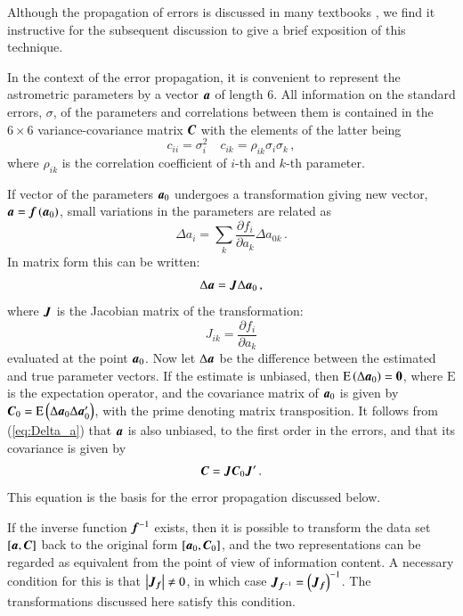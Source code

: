\documentclass{aa}
\def\vec#1{\ensuremath{\mathchoice{\mbox{\boldmath$\displaystyle#1$}}
{\mbox{\boldmath$\textstyle#1$}}
{\mbox{\boldmath$\scriptstyle#1$}}
{\mbox{\boldmath$\scriptscriptstyle#1$}}}}
\begin{document}
Although the propagation of errors is discussed in many textbooks \citep[see, for example,][]{brandt,bevington+robinson}, we find it instructive for the subsequent discussion to give a brief exposition of this technique.

In the context of the error propagation, it is convenient to represent the astrometric parameters by a vector $\vec{a}$ of length 6. All information on the standard errors, $\sigma$, of the parameters and correlations between them is contained in the $6\times 6$ variance-covariance matrix $\vec{C}$ with the elements of the latter being
\begin{equation}
    c_{ii}=\sigma_i^2\quad c_{ik}=\rho_{ik}\sigma_i\sigma_k\,,
\end{equation}
where $\rho_{ik}$ is the correlation coefficient of $i$-th and $k$-th parameter.

If vector of the parameters $\vec{a}_0$ undergoes a transformation giving new vector,  $\vec{a}=\vec{f}\left(\vec{a}_0\right)$, small variations in the parameters are related as
\begin{equation}
 \Delta a_i=\sum_k\frac{\partial f_i}{\partial a_k}\Delta a_{0k}\,.
\end{equation}
In matrix form this can be written:
\begin{equation}\label{eq:Delta_a}
 \Delta\vec{a}=\vec{J}\Delta\vec{a}_0\,,
\end{equation}
where $\vec{J}$ is the Jacobian matrix of the transformation:
\begin{equation}
 J_{ik}=\frac{\partial f_i}{\partial a_k}
\end{equation}
evaluated at the point $\vec{a}_0$. Now let $\Delta\vec{a}$ be the difference between the estimated and true parameter vectors. If the estimate is unbiased, then $\mathrm E\left(\Delta\vec{a}_0\right)=\vec{0}$, where $\mathrm E$ is the expectation operator, and the covariance matrix of $\vec{a}_0$ is given by $\vec{C}_0=\mathrm E\left(\Delta\vec{a}_0\Delta\vec{a}_0'\right)$, with the prime denoting matrix transposition. It follows from (\ref{eq:Delta_a}) that $\vec{a}$ is also unbiased, to the first order in the errors, and that its covariance is given by
\begin{equation}\label{eq:covariance_matrix}
    \vec{C}=\vec{J}\vec{C}_0\vec{J}'\,.
\end{equation}
This equation is the basis for the error propagation discussed below.

If the inverse function $\vec{f}^{-1}$ exists, then it is possible to transform the data set $\left[\vec{a}, \vec{C}\right]$ back to the original form $\left[\vec{a}_0, \vec{C}_0\right]$, and the two representations can be regarded as equivalent from the point of view of information content. A necessary condition for this is that $\left|\vec{J_f}\right|\neq 0$,
in which case ${\vec{J}}_{\vec{f}^{-1}}=\left(\vec{J}_{\vec{f}}\right)^{-1}$. The transformations discussed here satisfy this condition.
\end{document}
